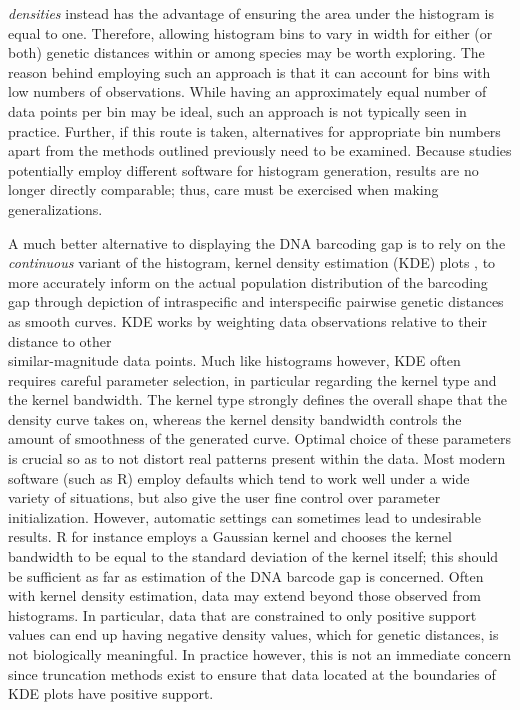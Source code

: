\textit{densities} instead has the advantage of ensuring the area under the histogram is equal to one. Therefore, allowing histogram bins to vary in width for either (or both) genetic distances within or among species may be worth exploring. The reason behind employing such an approach is that it can account for bins with low numbers of observations. While having an approximately equal number of data points per bin may be ideal, such an approach is not typically seen in practice. Further, if this route is taken, alternatives for appropriate bin numbers apart from the methods outlined previously need to be examined. Because studies potentially employ different software for histogram generation, results are no longer directly comparable; thus, care must be exercised when making generalizations.



A much better alternative to displaying the DNA barcoding gap is to rely on the \\ \textit{continuous} variant of the histogram, kernel density estimation (KDE) plots \cite{rosenblatt1956remarks, parzen1962estimation}, to more accurately inform on the actual population distribution of the barcoding gap through depiction of intraspecific and interspecific pairwise genetic distances as smooth curves. KDE works by weighting data observations relative to their distance to other \\ similar-magnitude data points. Much like histograms however, KDE often requires careful parameter selection, in particular regarding the kernel type and the kernel bandwidth. The kernel type strongly defines the overall shape that the density curve takes on, whereas the kernel density bandwidth controls the amount of smoothness of the generated curve. Optimal choice of these parameters is crucial so as to not distort real patterns present within the data. Most modern software (such as R) employ defaults which tend to work well under a wide variety of situations, but also give the user fine control over parameter initialization. However, automatic settings can sometimes lead to undesirable results. R for instance employs a Gaussian kernel and chooses the kernel bandwidth to be equal to the standard deviation of the kernel itself; this should be sufficient as far as estimation of the DNA barcode gap is concerned. Often with kernel density estimation, data may extend beyond those observed from histograms. In particular, data that are constrained to only positive support values can end up having negative density values, which for genetic distances, is not biologically meaningful. In practice however, this is not an immediate concern since truncation methods exist to ensure that data located at the boundaries of KDE plots have positive support.    



